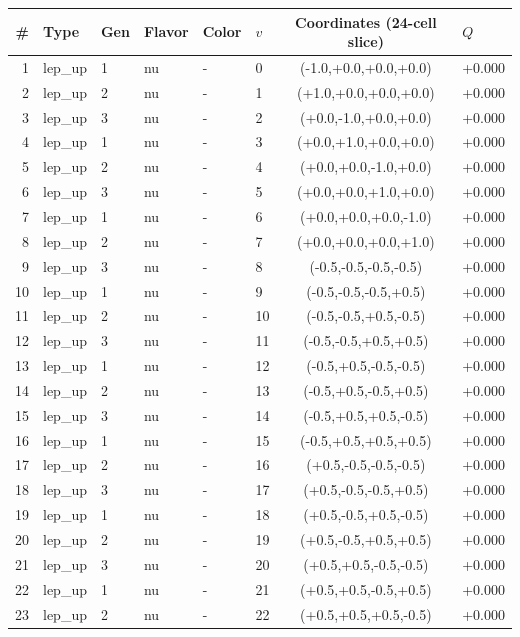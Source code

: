 \begin{longtable}{rlllllcl}
\toprule
\# & Type & Gen & Flavor & Color & $v$ & Coordinates (24-cell slice) & $Q$ \\
\midrule
\endhead
1 & lep\_up & 1 & nu & - & 0 & (-1.0,+0.0,+0.0,+0.0) & +0.000 \\
2 & lep\_up & 2 & nu & - & 1 & (+1.0,+0.0,+0.0,+0.0) & +0.000 \\
3 & lep\_up & 3 & nu & - & 2 & (+0.0,-1.0,+0.0,+0.0) & +0.000 \\
4 & lep\_up & 1 & nu & - & 3 & (+0.0,+1.0,+0.0,+0.0) & +0.000 \\
5 & lep\_up & 2 & nu & - & 4 & (+0.0,+0.0,-1.0,+0.0) & +0.000 \\
6 & lep\_up & 3 & nu & - & 5 & (+0.0,+0.0,+1.0,+0.0) & +0.000 \\
7 & lep\_up & 1 & nu & - & 6 & (+0.0,+0.0,+0.0,-1.0) & +0.000 \\
8 & lep\_up & 2 & nu & - & 7 & (+0.0,+0.0,+0.0,+1.0) & +0.000 \\
9 & lep\_up & 3 & nu & - & 8 & (-0.5,-0.5,-0.5,-0.5) & +0.000 \\
10 & lep\_up & 1 & nu & - & 9 & (-0.5,-0.5,-0.5,+0.5) & +0.000 \\
11 & lep\_up & 2 & nu & - & 10 & (-0.5,-0.5,+0.5,-0.5) & +0.000 \\
12 & lep\_up & 3 & nu & - & 11 & (-0.5,-0.5,+0.5,+0.5) & +0.000 \\
13 & lep\_up & 1 & nu & - & 12 & (-0.5,+0.5,-0.5,-0.5) & +0.000 \\
14 & lep\_up & 2 & nu & - & 13 & (-0.5,+0.5,-0.5,+0.5) & +0.000 \\
15 & lep\_up & 3 & nu & - & 14 & (-0.5,+0.5,+0.5,-0.5) & +0.000 \\
16 & lep\_up & 1 & nu & - & 15 & (-0.5,+0.5,+0.5,+0.5) & +0.000 \\
17 & lep\_up & 2 & nu & - & 16 & (+0.5,-0.5,-0.5,-0.5) & +0.000 \\
18 & lep\_up & 3 & nu & - & 17 & (+0.5,-0.5,-0.5,+0.5) & +0.000 \\
19 & lep\_up & 1 & nu & - & 18 & (+0.5,-0.5,+0.5,-0.5) & +0.000 \\
20 & lep\_up & 2 & nu & - & 19 & (+0.5,-0.5,+0.5,+0.5) & +0.000 \\
21 & lep\_up & 3 & nu & - & 20 & (+0.5,+0.5,-0.5,-0.5) & +0.000 \\
22 & lep\_up & 1 & nu & - & 21 & (+0.5,+0.5,-0.5,+0.5) & +0.000 \\
23 & lep\_up & 2 & nu & - & 22 & (+0.5,+0.5,+0.5,-0.5) & +0.000 \\

\end{longtable}
